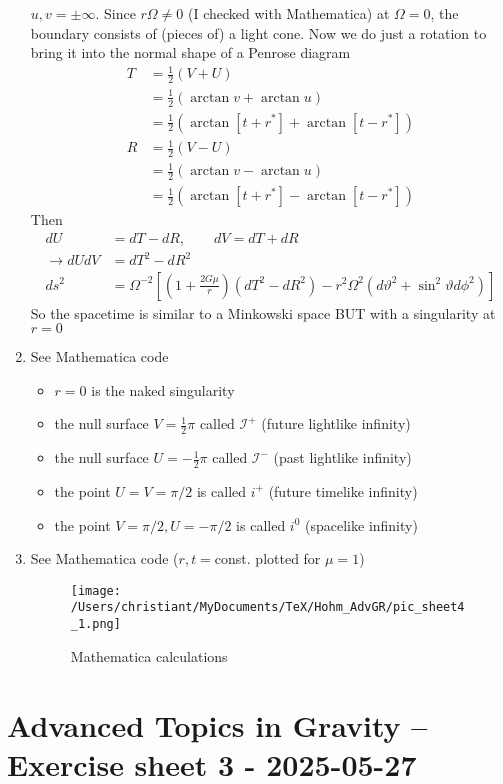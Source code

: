 \documentclass[10pt,a4paper]{article}
\theoremstyle{definition}
\begin{document}
\begin{enumerate}
$u,v=\pm\infty$. Since $r\Omega\neq 0$ (I checked with Mathematica) at $\Omega= 0$, the boundary consists of (pieces of) a light cone.
Now we do just a rotation to bring it into the normal shape of a Penrose diagram
\begin{align}
T&=\frac{1}{2}(V+U)\\
&=\frac{1}{2}(\arctan{v}+\arctan{u})\\
&=\frac{1}{2}(\arctan{[t+r^*]}+\arctan{[t-r^*]})\\
R&=\frac{1}{2}(V-U)\\
&=\frac{1}{2}(\arctan{v}-\arctan{u})\\
&=\frac{1}{2}(\arctan{[t+r^*]}-\arctan{[t-r^*]})
\end{align}
Then
\begin{align}
dU&=dT-dR,\qquad dV=dT+dR\\
\rightarrow dU dV&=dT^2-dR^2\\
ds^2&=\Omega^{-2}\left[\left(1 + \frac{2G\mu}{r}\right)(dT^2-dR^2) - r^2\Omega^2(d\vartheta^2+\sin^2\vartheta d\phi^2)\right]
\end{align}
So the spacetime is similar to a Minkowski space BUT with a singularity at $r=0$ 
\item See Mathematica code
\begin{itemize}
\item $r=0$ is the naked singularity
\item the null surface $V=\frac{1}{2}\pi$ called $\mathcal{I}^+$ (future lightlike infinity)
\item the null surface $U=-\frac{1}{2}\pi$ called $\mathcal{I}^-$ (past lightlike infinity)
\item the point $U=V=\pi/2$ is called $i^+$ (future timelike infinity)
\item the point $V=\pi/2, U=-\pi/2$ is called $i^0$ (spacelike infinity)
\end{itemize}
\item See Mathematica code ($r,t= $const. plotted for $\mu=1$)
\begin{figure}[!h]
\centering
\texttt{[image: /Users/christiant/MyDocuments/TeX/Hohm\_AdvGR/pic\_sheet4\_1.png]}
\caption{Mathematica calculations}
\end{figure}
\end{enumerate}

\newpage

\section*{Advanced Topics in Gravity – Exercise sheet 3 - 2025-05-27}
\end{document}
